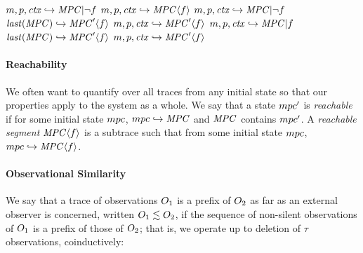 \documentclass[acmsmall,review,anonymous]{acmart}\settopmatter{printfolios=true,printccs=false,printacmref=false}
\begin{document}
\begin{center}
              {\(m,p,\mathit{ctx} \hookrightarrow \mathit{MPC} | \neg f\)}
              {\(m,p,\mathit{ctx} \hookrightarrow \mathit{MPC} \langle f \rangle\)}
%
                {\(m,p,\mathit{ctx} \hookrightarrow \mathit{MPC} | \neg f\)}
                {\(\mathit{last}(\mathit{MPC}) \hookrightarrow \mathit{MPC}' \langle f \rangle\)}
                {\(m,p,\mathit{ctx} \hookrightarrow \mathit{MPC}' \langle f \rangle\)}
%
                {\(m,p,\mathit{ctx} \hookrightarrow \mathit{MPC} | f\)}
                {\(\mathit{last}(\mathit{MPC}) \hookrightarrow \mathit{MPC}' \langle f \rangle\)}
                {\(m,p,\mathit{ctx} \hookrightarrow \mathit{MPC}' \langle f \rangle\)}
\end{center}

\paragraph*{Reachability}

We often want to quantify over all traces from any initial state so that our
properties apply to the system as a whole. We say that a state \(mpc'\)
is {\em reachable} if for some initial state \(mpc\), \(mpc \hookrightarrow \mathit{MPC}\)
and \(\mathit{MPC}\) contains \(mpc'\). A {\it reachable segment} \(\mathit{MPC} \langle f \rangle\) is a subtrace
such that from some initial state \(mpc\), \(mpc \hookrightarrow \mathit{MPC} \langle f \rangle\).

\paragraph*{Observational Similarity}

We say that a trace of observations $O_1$ is a prefix of $O_2$
as far as an external observer is concerned, written \(O_1 \lesssim
O_2\), if the sequence of
non-silent observations of $O_1$ is a prefix of those of
$O_2$; that is, we operate up to deletion of \(\tau\) observations,
coinductively:

\begin{minipage}{.3\textwidth}
  \judgment{}{\(\obsT \lesssim \obsT\)}
\end{minipage}
\begin{minipage}{.3\textwidth}
\judgment{}{\(\tau \lesssim \obsT\)}
\end{minipage}
\begin{minipage}{.3\textwidth}
\end{minipage}
\end{document}
